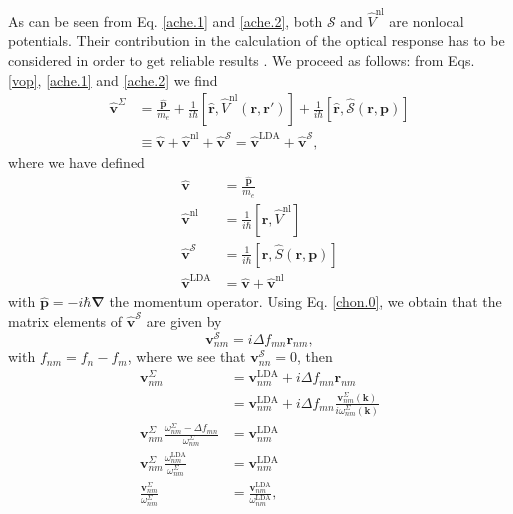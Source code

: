 As can be seen from Eq. \eqref{ache.1} and \eqref{ache.2}, both $\mathcal{S}$
and $\hat{V}^{\mathrm{nl}}$ are nonlocal potentials. Their contribution in the
calculation of the optical response has to be considered in order to get
reliable results \cite{ismailPRL01}. We proceed as follows: from Eqs.
\eqref{vop}, \eqref{ache.1} and \eqref{ache.2} we find
\begin{align}\label{vop2}
\hat{\mathbf{v}}^{\Sigma} &=
\frac{\hat{\mathbf{p}}}{m_{e}} + \frac{1}{i\hbar}
\left[\hat{\mathbf{r}},\hat{V}^{\mathrm{nl}}(\mathbf{r},\mathbf{r}')\right]
+ \frac{1}{i\hbar}
  \left[\hat{\mathbf{r}},\hat{\mathcal{S}}(\mathbf{r},\mathbf{p})\right]
\nonumber\\
&\equiv
\hat{\mathbf{v}} + \hat{\mathbf{v}}^{\mathrm{nl}} + \hat{\mathbf{v}}^\mathcal{S}
= \hat{\mathbf{v}}^\mathrm{LDA} + \hat{\mathbf{v}}^\mathcal{S},
\end{align}
where we have defined
\begin{equation}\label{conhr}
\begin{split}
\hat{\mathbf{v}} &=\frac{\hat{\mathbf{p}}}{m_{e}}\\
\hat{\mathbf{v}}^{\mathrm{nl}} &= \frac{1}{i\hbar}
  \left[\hat{\mathbf{r}},\hat{V}^{\mathrm{nl}}\right]\\
\hat{\mathbf{v}}^\mathcal{S} &= \frac{1}{i\hbar}
  \left[\hat{\mathbf{r}},\hat{S}(\mathbf{r},\mathbf{p})\right]\\
\hat{\mathbf{v}}^\mathrm{LDA} &= \hat{\mathbf{v}}+\hat{\mathbf{v}}^{\mathrm{nl}}
\end{split}
\end{equation}  
with $\hat{\mathbf{p}}= -i\hbar\boldsymbol{\nabla}$ the momentum operator. Using
Eq. \eqref{chon.0}, we obtain that the matrix elements of
$\hat{\mathbf{v}}^\mathcal{S}$ are given by
\begin{equation}\label{chon.2} 
\mathbf{v}^\mathcal{S}_{nm} = i\Delta f_{mn}\mathbf{r}_{nm},
\end{equation}
with $f_{nm} = f_{n} - f_{m}$, where we see that $\mathbf{v}^\mathcal{S}_{nn} =
0$, then
\begin{align}\label{chon.8}
\mathbf{v}^\Sigma_{nm} 
&= \mathbf{v}^\mathrm{LDA}_{nm} + i\Delta f_{mn}\mathbf{r}_{nm}\nonumber\\
&= \mathbf{v}^\mathrm{LDA}_{nm} + i\Delta f_{mn}
   \frac{\mathbf{v}^\Sigma_{nm}(\mathbf{k})}{i\omega^\Sigma_{nm}(\mathbf{k})}
   \nonumber\\
\mathbf{v}^\Sigma_{nm}
  \frac{\omega^\Sigma_{nm}-\Delta f_{mn}}{\omega^\Sigma_{nm}}
&= \mathbf{v}^\mathrm{LDA}_{nm}\nonumber\\
\mathbf{v}^\Sigma_{nm}\frac{\omega^{\mathrm{LDA}}_{nm}}{\omega^\Sigma_{nm}}
&= \mathbf{v}^\mathrm{LDA}_{nm}\nonumber\\
\frac{\mathbf{v}^\Sigma_{nm}}{\omega^\Sigma_{nm}}
&= \frac{\mathbf{v}^\mathrm{LDA}_{nm}}{\omega^{\mathrm{LDA}}_{nm}},
\end{align}

